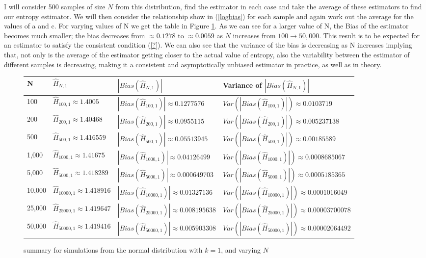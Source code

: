 \documentclass{article}
\begin{document}
I will consider 500 samples of size $N$ from this distribution, find the estimator in each case and take the average of these estimators to find our entropy estimator. We will then consider the relationship show in (\ref{logbias}) for each sample and again work out the average for the values of a and c. For varying values of N we get the table in Figure \ref{fig:normal_k=1}. As we can see for a larger value of N, the Bias of the estimator becomes much smaller; the bias decreases from $\approx 0.1278$ to $\approx 0.0059$ as $N$ increases from $100 \to 50,000$. This result is to be expected for an estimator to satisfy the consistent condition (\ref{?}). We can also see that the variance of the bias is decreasing as N increases implying that, not only is the average of the estimator getting closer to the actual value of entropy,  also the variability between the estimator of different samples is decreasing, making it a consistent and asymptotically unbiased estimator in practice, as well as in theory.

\begin{figure} 
 \begin{adjustwidth}{-2cm}{}
\begin{tabular}{|l|l|l|l|}
\hline
N & $\hat{H}_{N, 1}$ & $|Bias(\hat{H}_{N, 1})|$ & Variance of $|Bias(\hat{H}_{N, 1})|$ \\
\hline
100 & $\hat{H}_{100, 1} \approx 1.4005$ & $|Bias(\hat{H}_{100, 1})| \approx 0.1277576$ & $Var(|Bias(\hat{H}_{100, 1})|) \approx 0.0103719$\\
200 & $\hat{H}_{200, 1} \approx 1.40468$ & $|Bias(\hat{H}_{200, 1})| \approx 0.0955115$ & $Var(|Bias(\hat{H}_{200, 1})|) \approx 0.005237138$\\
500 & $\hat{H}_{500, 1} \approx 1.416559$ & $|Bias(\hat{H}_{500, 1})| \approx 0.05513945$ & $Var(|Bias(\hat{H}_{500, 1})|) \approx 0.00185589$\\
1,000 & $\hat{H}_{1000, 1} \approx 1.41675$ & $|Bias(\hat{H}_{1000, 1})| \approx 0.04126499$ & $Var(|Bias(\hat{H}_{1000, 1})|) \approx 0.0008685067$\\
5,000 & $\hat{H}_{5000, 1} \approx 1.418289$ & $|Bias(\hat{H}_{5000, 1})| \approx 0.000649703$ & $Var(|Bias(\hat{H}_{5000, 1})|) \approx 0.0005185365 $\\
10,000 & $\hat{H}_{10000, 1} \approx 1.418916$ & $|Bias(\hat{H}_{10000, 1})| \approx 0.01327136$ & $Var(|Bias(\hat{H}_{10000, 1})|) \approx 0.0001016049$\\
25,000 & $\hat{H}_{25000, 1} \approx 1.419647$ & $|Bias(\hat{H}_{25000, 1})| \approx 0.008195638$ & $Var(|Bias(\hat{H}_{25000, 1})|) \approx 0.00003700078$\\
50,000 & $\hat{H}_{50000, 1} \approx 1.419416$ & $|Bias(\hat{H}_{50000, 1})| \approx 0.005903308$ & $Var(|Bias(\hat{H}_{50000, 1})|) \approx 0.00002064492$\\
\hline
\end{tabular}
\caption{\label{fig:normal_k=1} summary for simulations from the normal distribution with $k=1$, and varying $N$}
 \end{adjustwidth}
\end{figure}
\end{document}
